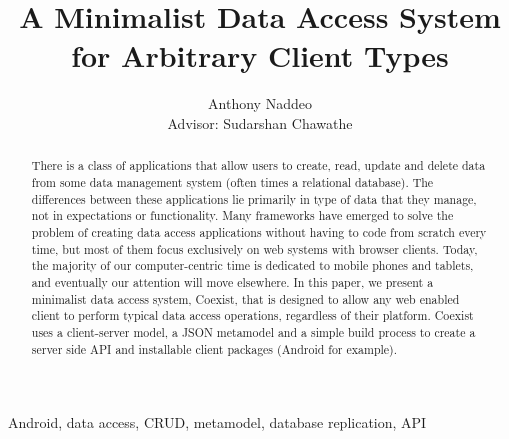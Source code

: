 \documentclass[journal]{IEEEtran}
\begin{document}
\title{A Minimalist Data Access System for Arbitrary Client Types} 
\author{Anthony Naddeo \\ Advisor: Sudarshan Chawathe}

\maketitle


\begin{abstract}
There is a class of applications that allow users to create, read, update and
delete data from some data management system (often times a relational
database). The differences between these applications lie primarily in type of
data that they manage, not in expectations or functionality. Many frameworks
have emerged to solve the problem of creating data access applications without
having to code from scratch every time, but most of them focus exclusively on
web systems with browser clients. Today, the majority of our computer-centric
time is dedicated to mobile phones and tablets, and eventually our attention
will move elsewhere. In this paper, we present a minimalist data access system,
Coexist, that is designed to allow any web enabled client to perform typical
data access operations, regardless of their platform. Coexist uses a
client-server model, a JSON metamodel and a simple build process to create
a server side API and installable client packages (Android for example).
\end{abstract}


\begin{IEEEkeywords}
Android, data access, CRUD, metamodel, database replication, API
\end{IEEEkeywords}

\IEEEpeerreviewmaketitle































\end{document}
